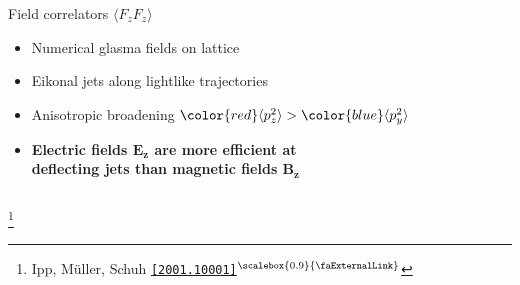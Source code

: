\documentclass[aspectratio=169,11pt,usenames,dvipsnames]{beamer}
\renewcommand{\thefootnote}{\color{customblue}\faPaperPlaneO}
\newcommand\blfootnote[1]{%
  \begingroup
  \renewcommand\thefootnote{}\footnote{#1}%
  \addtocounter{footnote}{-1}%
  \endgroup
}
\begin{document}
\begin{frame}[t,noframenumbering]
\begin{columns}[onlytextwidth,t]
        \begin{center}
            {\Large\color{isgold} Field correlators $\langle F_zF_z\rangle$ \\[10pt]}
            \footnotesize
                \begin{itemize}
                    \item {\color{lightgray}Numerical glasma fields on lattice}
                    \item {\color{lightgray} Eikonal jets along lightlike trajectories}
                    \item {\color{lightgray}Anisotropic broadening ${\color{red}\langle p^2_z\rangle}>{\color{blue}\langle p^2_y\rangle}$}\\[15pt]
                    \item {\color{destacado}\bfseries\normalsize{\color{red}Electric fields $\boldsymbol{E_z}$} are more efficient at \\deflecting jets than {\color{blue}magnetic fields $\boldsymbol{B_z}$}}
                \end{itemize}
        \end{center}
    \end{columns}
    \blfootnote{\scriptsize Ipp, Müller, Schuh \href{https://arxiv.org/abs/2001.10001}{\color{palgold}\texttt{[2001.10001]}$^\text{\scalebox{0.9}{\faExternalLink}}$}}
\end{frame}



\end{document}
